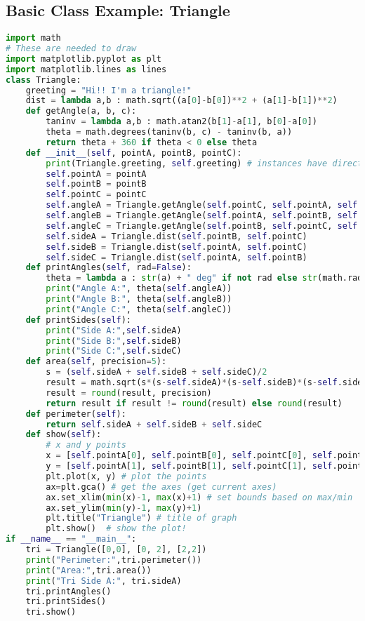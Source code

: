 \documentclass[11pt, twoside, reqno]{book}
\begin{document}
\subsection{Basic Class Example: Triangle}
\begin{lstlisting}[language=Python]
import math
# These are needed to draw
import matplotlib.pyplot as plt 
import matplotlib.lines as lines
class Triangle:
    greeting = "Hi!! I'm a triangle!"
    dist = lambda a,b : math.sqrt((a[0]-b[0])**2 + (a[1]-b[1])**2)
    def getAngle(a, b, c):
        taninv = lambda a,b : math.atan2(b[1]-a[1], b[0]-a[0])
        theta = math.degrees(taninv(b, c) - taninv(b, a))
        return theta + 360 if theta < 0 else theta
    def __init__(self, pointA, pointB, pointC):
        print(Triangle.greeting, self.greeting) # instances have direct access to class variables
        self.pointA = pointA
        self.pointB = pointB
        self.pointC = pointC
        self.angleA = Triangle.getAngle(self.pointC, self.pointA, self.pointB)
        self.angleB = Triangle.getAngle(self.pointA, self.pointB, self.pointC)
        self.angleC = Triangle.getAngle(self.pointB, self.pointC, self.pointA)
        self.sideA = Triangle.dist(self.pointB, self.pointC)
        self.sideB = Triangle.dist(self.pointA, self.pointC)
        self.sideC = Triangle.dist(self.pointA, self.pointB)
    def printAngles(self, rad=False):
        theta = lambda a : str(a) + " deg" if not rad else str(math.radians(a)) + " rad"
        print("Angle A:", theta(self.angleA))
        print("Angle B:", theta(self.angleB))
        print("Angle C:", theta(self.angleC))
    def printSides(self):
        print("Side A:",self.sideA)
        print("Side B:",self.sideB)
        print("Side C:",self.sideC)
    def area(self, precision=5):
        s = (self.sideA + self.sideB + self.sideC)/2
        result = math.sqrt(s*(s-self.sideA)*(s-self.sideB)*(s-self.sideC))
        result = round(result, precision)
        return result if result != round(result) else round(result)
    def perimeter(self):
        return self.sideA + self.sideB + self.sideC
    def show(self):        
        # x and y points
        x = [self.pointA[0], self.pointB[0], self.pointC[0], self.pointA[0]]
        y = [self.pointA[1], self.pointB[1], self.pointC[1], self.pointA[1]]
        plt.plot(x, y) # plot the points
        ax=plt.gca() # get the axes (get current axes)
        ax.set_xlim(min(x)-1, max(x)+1) # set bounds based on max/min
        ax.set_ylim(min(y)-1, max(y)+1)
        plt.title("Triangle") # title of graph
        plt.show()  # show the plot!
if __name__ == "__main__":
    tri = Triangle([0,0], [0, 2], [2,2])
    print("Perimeter:",tri.perimeter())
    print("Area:",tri.area())
    print("Tri Side A:", tri.sideA)
    tri.printAngles()
    tri.printSides()
    tri.show()
\end{lstlisting}
\end{document}

